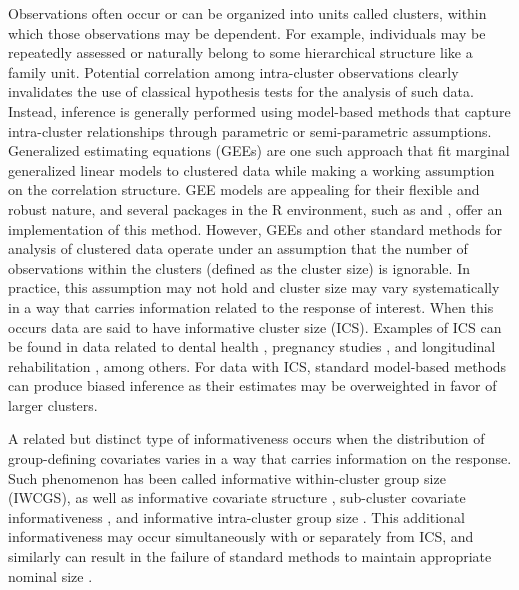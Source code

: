 Observations often occur or can be organized into units called clusters, within which those observations may be dependent. For example, individuals may be repeatedly assessed or naturally belong to some hierarchical structure like a family unit. Potential correlation among intra-cluster observations clearly invalidates the use of classical hypothesis tests for the analysis of such data. Instead, inference is generally performed using model-based methods that capture intra-cluster relationships through parametric or semi-parametric assumptions. Generalized estimating equations (GEEs) are one such approach that fit marginal generalized linear models to clustered data while making a working assumption on the correlation structure. GEE models are appealing for their flexible and robust nature, and several packages in the R environment, such as  \citep{carey19} and  \citep{halekoh06}, offer an implementation of this method. However, GEEs and other standard methods for analysis of clustered data operate under an assumption that the number of observations within the clusters (defined as the cluster size) is ignorable. In practice, this assumption may not hold and cluster size may vary systematically in a way that carries information related to the response of interest. When this occurs data are said to have informative cluster size (ICS). Examples of ICS can be found in data related to dental health \citep{williamson03}, pregnancy studies \citep{chaurasia18}, and longitudinal rehabilitation \citep{lorenz11}, among others. For data with ICS, standard model-based methods can produce biased inference as their estimates may be overweighted in favor of larger clusters. 

A related but distinct type of informativeness occurs when the distribution of group-defining covariates varies in a way that carries information on the response. Such phenomenon has been called informative within-cluster group size (IWCGS), as well as informative covariate structure \citep{pavlou12}, sub-cluster covariate informativeness \citep{lorenz18}, and informative intra-cluster group size \citep{dutta16}. This additional informativeness may occur simultaneously with or separately from ICS, and similarly can result in the failure of standard methods to maintain appropriate nominal size \citep{huang11, dutta16}.

